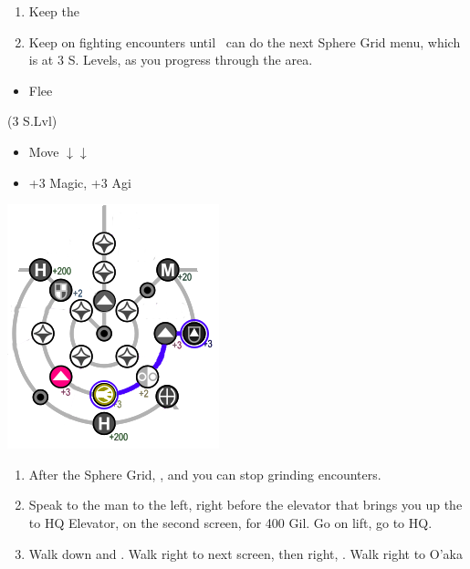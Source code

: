 \begin{enumerate}[resume]
	\item Keep the \formation{\kimahri}{\wakka}{\yuna}
	\item Keep on fighting encounters until \yuna\ can do the next Sphere Grid menu, which is at 3 S. Levels, as you progress through the area.
\end{enumerate}
\begin{encounters}
	\begin{itemize}
		\wakkaf Attack Raptors or Gandarewas
		\yunaf Defend
		\item Flee
	\end{itemize}
\end{encounters}
\bothvfill\winvfill\lossvfill
\begin{spheregrid}
	\begin{itemize}
		\yunaf (3 S.Lvl)
		\begin{itemize}
			\item Move $\downarrow\downarrow$
			\item +3 Magic, +3 Agi
		\end{itemize}
		\includegraphics{graphics/Yuna_MRR_2}
	\end{itemize}
\end{spheregrid}
\begin{enumerate}[resume]
	\item After the Sphere Grid, \formation{\tidus}{\yuna}{\wakka}, and you can stop grinding encounters.
	\item Speak to the man to the left, right before the elevator that brings you up the to HQ Elevator, on the second screen, for 400 Gil. Go on lift, go to HQ.
	\item Walk down and \sd. Walk right to next screen, then right, \sd. Walk right to O'aka
\end{enumerate}
